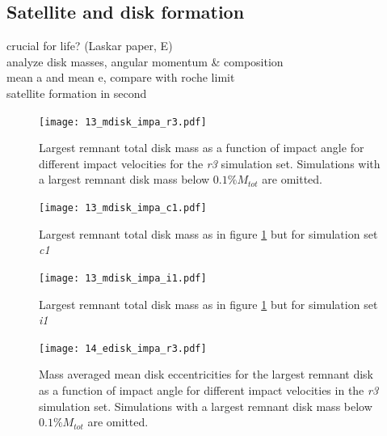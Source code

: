 {%
\subsection{Satellite and disk formation}
crucial for life? (Laskar paper, E)\\
analyze disk masses, angular momentum \& composition \\
mean a and mean e, compare with roche limit \\
satellite formation in second \\

\begin{landscape}
\begin{figure}
\begin{center}
\texttt{[image: 13\_mdisk\_impa\_r3.pdf]}
\caption{Largest remnant total disk mass as a function of impact angle for different impact velocities for the \emph{r3} simulation set. Simulations with a largest remnant disk mass below $0.1\% M_{tot}$ are omitted.}
\label{ch03_fig13a}
\end{center}
\end{figure}

\begin{figure}
\begin{center}
\texttt{[image: 13\_mdisk\_impa\_c1.pdf]}
\caption{Largest remnant total disk mass as in figure \ref{ch03_fig13a} but for simulation set \emph{c1}}
\label{ch03_fig13b}
\end{center}
\end{figure}

\begin{figure}
\begin{center}
\texttt{[image: 13\_mdisk\_impa\_i1.pdf]}
\caption{Largest remnant total disk mass as in figure \ref{ch03_fig13a} but for simulation set \emph{i1}}
\label{ch03_fig13c}
\end{center}
\end{figure}

\begin{figure}
\begin{center}
\texttt{[image: 14\_edisk\_impa\_r3.pdf]}
\caption{Mass averaged mean disk eccentricities for the largest remnant disk as a function of impact angle for different impact velocities in the \emph{r3} simulation set. Simulations with a largest remnant disk mass below $0.1\% M_{tot}$ are omitted.}
\label{ch03_fig14a}
\end{center}
\end{figure}


\end{landscape}}
